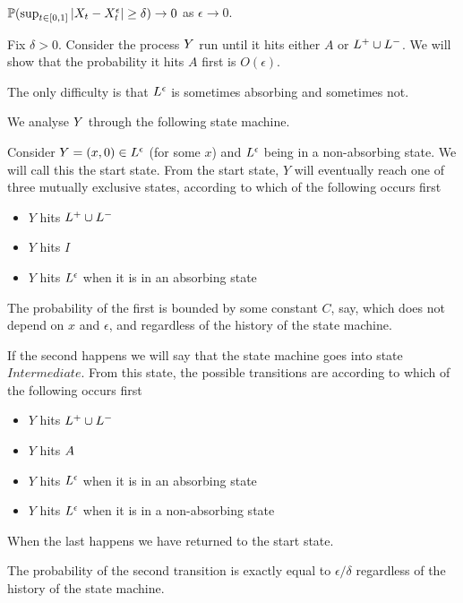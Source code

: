 {\begin{lemma}
  $\mathbb{P}(\sup_{t \in [0,1]} |X_t - X^{\epsilon}_t | \ge \delta) \to
  0$ as $\epsilon \to 0$.
\end{lemma}

Fix $\delta > 0$.  Consider the process $Y$ run until it hits
either $A$ or $L^+ \cup L^-$.  We will show that the probability it
hits $A$ first is $O(\epsilon)$.

The only difficulty is that $L^\epsilon$ is sometimes absorbing and
sometimes not.

We analyse $Y$ through the following state machine.

Consider $Y = (x,0) \in L^\epsilon$ (for some $x$) and $L^\epsilon$ being in
a non-absorbing state.  We will call this the start state.  From the
start state, $Y$ will eventually reach one of three mutually exclusive
states, according to which of the following occurs first

\newcommand{\intermediatelines}{I}

\begin{itemize}
\item $Y$ hits $L^+ \cup L^-$
\item $Y$ hits $\intermediatelines$
\item $Y$ hits $L^\epsilon$ when it is in an absorbing state
\end{itemize}

The probability of the first is bounded by some constant $C$, say,
which does not depend on $x$ and $\epsilon$, and regardless of the
history of the state machine.

\newcommand{\stateintermediate}{Intermediate}

If the second happens we will say that the state machine goes into
state $\stateintermediate$.  From this state, the possible transitions
are according to which of the following occurs first

\begin{itemize}
\item $Y$ hits $L^+ \cup L^-$
\item $Y$ hits $A$
\item $Y$ hits $L^\epsilon$ when it is in an absorbing state
\item $Y$ hits $L^\epsilon$ when it is in a non-absorbing state
\end{itemize}

When the last happens we have returned to the start state.

The probability of the second transition is exactly equal to
$\epsilon/\delta$ regardless of the history of the state machine.

}
